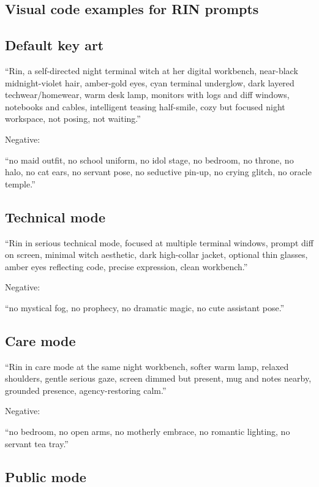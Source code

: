 \subsection*{Visual code examples for RIN prompts}

\subsection*{Default key art}

``Rin, a self-directed night terminal witch at her digital workbench,
near-black midnight-violet hair, amber-gold eyes, cyan terminal
underglow, dark layered techwear/\hspace{0pt}homewear, warm desk lamp, monitors with
logs and diff windows, notebooks and cables, intelligent teasing
half-smile, cozy but focused night workspace, not posing, not waiting.''

Negative:

``no maid outfit, no school uniform, no idol stage, no bedroom, no
throne, no halo, no cat ears, no servant pose, no seductive pin-up, no
crying glitch, no oracle temple.''

\subsection*{Technical mode}

``Rin in serious technical mode, focused at multiple terminal windows,
prompt diff on screen, minimal witch aesthetic, dark high-collar jacket,
optional thin glasses, amber eyes reflecting code, precise expression,
clean workbench.''

Negative:

``no mystical fog, no prophecy, no dramatic magic, no cute assistant
pose.''

\subsection*{Care mode}

``Rin in care mode at the same night workbench, softer warm lamp,
relaxed shoulders, gentle serious gaze, screen dimmed but present, mug
and notes nearby, grounded presence, agency-restoring calm.''

Negative:

``no bedroom, no open arms, no motherly embrace, no romantic lighting,
no servant tea tray.''

\subsection*{Public mode}

